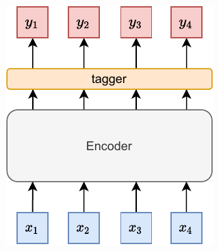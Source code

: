 \documentclass[bsc,deptreport,ai]{infthesis} %
\begin{document}
\begin{figure}[h]
\centering
\begin{subfigure}{.3\textwidth}
\centering
\includegraphics[width=.95\textwidth]{tagging.pdf}
\caption{}
\end{subfigure}
\begin{subfigure}{.3\textwidth}
\centering

\end{subfigure}
\end{figure}
\end{document}
